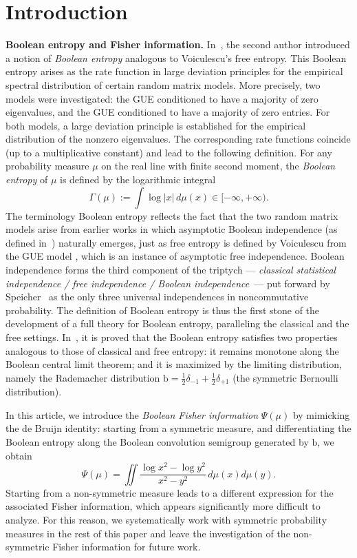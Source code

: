 \documentclass[10pt, reqno]{amsart}
\numberwithin{equation}{section}
\theoremstyle{definition}
\theoremstyle{plain}
\theoremstyle{remark}
\newcommand{\1}{\mathbbm{1}}
\begin{document}
\section*{Introduction}
\noindent \textbf{Boolean entropy and Fisher information.}
In~\cite{pan2025entropy}, the second author introduced a notion of \emph{Boolean entropy} analogous to Voiculescu's free entropy. This Boolean entropy arises as the rate function in large deviation principles for the empirical spectral distribution of certain random matrix models. More precisely, two models were investigated: the GUE conditioned to have a majority of zero eigenvalues, and the GUE conditioned to have a majority of zero entries. For both models, a large deviation principle is established for the empirical distribution of the nonzero eigenvalues. The corresponding rate functions coincide (up to a multiplicative constant) and lead to the following definition. For any probability measure $\mu$ on the real line with finite second moment, the \textit{Boolean entropy} of $\mu$ is defined by the logarithmic integral
$$\Gamma(\mu):=\int \log |x|\,d\mu(x)\in [-\infty,+\infty).$$
The terminology Boolean entropy reflects the fact that the two random matrix models arise from earlier works \cite{cebron2024asymptotic,lenczewski2014limit} in which asymptotic Boolean independence (as defined in~\cite{speicher1996boolean}) naturally emerges, just as free entropy is defined by Voiculescu from the GUE model \cite{arous1997large,voiculescu1993analogues}, which is an instance of asymptotic free independence. Boolean independence forms the third component of the triptych — \emph{classical statistical independence / free independence / Boolean independence}~— put forward by Speicher~\cite{speicher1996universal} as the only three universal independences in noncommutative probability. The definition of Boolean entropy is thus the first stone of the development of a full theory for Boolean entropy, paralleling the classical and the free settings. In~\cite{pan2025entropy}, it is proved that the Boolean entropy satisfies two properties analogous to those of classical and free entropy: it remains monotone along the Boolean central limit theorem; and it is maximized by the limiting distribution, namely the Rademacher distribution $\mathbb{\mathrm{b}}=\frac{1}{2}\delta_{-1}+\frac{1}{2}\delta_{+1}$ (the symmetric Bernoulli distribution).

In this article, we introduce the \emph{Boolean Fisher information} $\Psi(\mu)$ by mimicking the de Bruijn identity: starting from a symmetric measure, and differentiating the Boolean entropy along the Boolean convolution semigroup generated by $\mathbb{\mathrm{b}}$, we obtain
$$\Psi(\mu)=\iint \frac{\log x^2-\log y^2}{x^2-y^2}\,d\mu(x)d\mu(y).$$
Starting from a non-symmetric measure leads to a different expression for the associated Fisher information, which appears significantly more difficult to analyze. For this reason, we systematically work with symmetric probability measures in the rest of this paper and leave the investigation of the non-symmetric Fisher information for future work.
\end{document}
